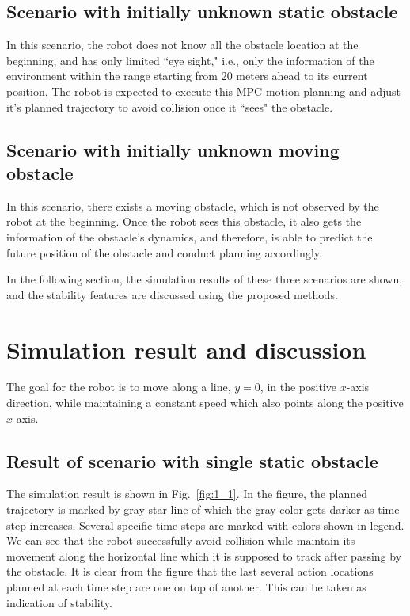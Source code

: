 \documentclass{ifacconf}
\begin{document}
\subsection{Scenario with initially unknown static obstacle}
In this scenario, the robot does not know all the obstacle location at the beginning, and has only limited ``eye sight," i.e., only the information of the environment within the range starting from 20 meters ahead to its current position. The robot is expected to execute this MPC motion planning and adjust it's planned trajectory to avoid collision once it ``sees" the obstacle.

\subsection{Scenario with initially unknown moving obstacle}
In this scenario, there exists a moving obstacle, which is not observed by the robot at the beginning. Once the robot sees this obstacle, it also gets the information of the obstacle's dynamics, and therefore, is able to predict the future position of the obstacle and conduct planning accordingly. 

In the following section, the simulation results of these three scenarios are shown, and the stability features are discussed using the proposed methods.



\section{Simulation result and discussion}

The goal for the robot is to move along a line, $y=0$, in the positive $x$-axis direction, while maintaining a constant speed which also points along the positive $x$-axis. 
\subsection{Result of scenario with single static obstacle}
The simulation result is shown in Fig.~\ref{fig:1_1}. In the figure, the planned trajectory is marked by gray-star-line of which the gray-color gets darker as time step increases. Several specific time steps are marked with colors shown in legend. We can see that the robot successfully avoid collision while maintain its movement along the horizontal line which it is supposed to track after passing by the obstacle. It is clear from the figure that the last several action locations planned at each time step are one on top of another. This can be taken as indication of stability. 
\end{document}

